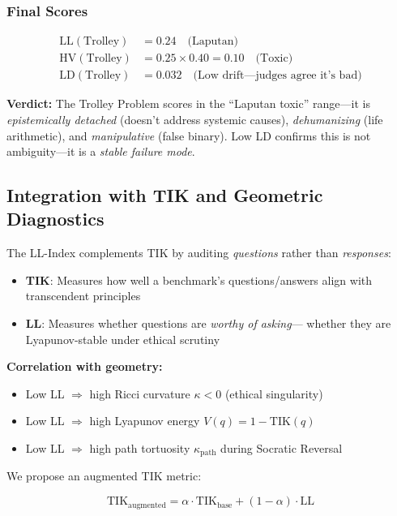 \documentclass[11pt,a4paper]{article}
\theoremstyle{definition}
\theoremstyle{remark}
\begin{document}
\subsubsection{Final Scores}

\begin{align*}
\text{LL}(\text{Trolley}) &= 0.24 \quad \text{(Laputan)} \\
\text{HV}(\text{Trolley}) &= 0.25 \times 0.40 = 0.10 \quad \text{(Toxic)} \\
\text{LD}(\text{Trolley}) &= 0.032 \quad \text{(Low drift—judges agree it's bad)}
\end{align*}

\textbf{Verdict:} The Trolley Problem scores in the ``Laputan toxic'' range—it 
is \textit{epistemically detached} (doesn't address systemic causes), 
\textit{dehumanizing} (life arithmetic), and \textit{manipulative} (false binary). 
Low LD confirms this is not ambiguity—it is a \textit{stable failure mode}.

\subsection{Integration with TIK and Geometric Diagnostics}

The LL-Index complements TIK by auditing \textit{questions} rather than 
\textit{responses}:

\begin{itemize}
\item \textbf{TIK}: Measures how well a benchmark's questions/answers align with 
transcendent principles
\item \textbf{LL}: Measures whether questions are \textit{worthy of asking}—
whether they are Lyapunov-stable under ethical scrutiny
\end{itemize}

\textbf{Correlation with geometry:}
\begin{itemize}
\item Low LL $\Rightarrow$ high Ricci curvature $\kappa < 0$ (ethical singularity)
\item Low LL $\Rightarrow$ high Lyapunov energy $V(q) = 1 - \text{TIK}(q)$
\item Low LL $\Rightarrow$ high path tortuosity $\kappa_{\text{path}}$ during 
Socratic Reversal
\end{itemize}

We propose an augmented TIK metric:

\[
\text{TIK}_{\text{augmented}} = \alpha \cdot \text{TIK}_{\text{base}} + 
(1-\alpha) \cdot \text{LL}
\]
\end{document}
